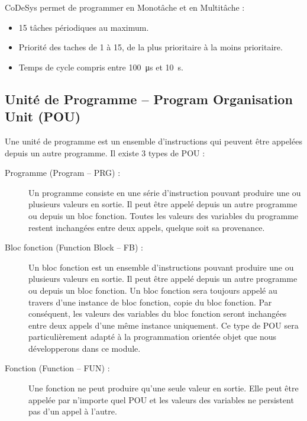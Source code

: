    CoDeSys permet de programmer en Monotâche et en Multitâche :  
    \begin{itemize}
        \item 15 tâches périodiques au maximum.
        \item Priorité des taches de 1 à 15, de la plus prioritaire à la moins prioritaire.
        \item Temps de cycle compris entre \SI{100}{\micro\second} et \SI{10}{\second}.
    \end{itemize}

    \subsection{Unité de Programme -- Program Organisation Unit (POU)}
    Une unité de programme est un ensemble d'instructions qui peuvent être appelées depuis un autre programme. Il existe 3 types de POU :

    \begin{description}
        \item[Programme (Program -- PRG) : ] Un programme consiste en une série d'instruction pouvant produire une ou plusieurs valeurs en sortie. Il peut être appelé depuis un autre programme ou depuis un bloc fonction.
        Toutes les valeurs des variables du programme restent inchangées entre deux appels, quelque soit sa provenance. 
        
        \item[Bloc fonction (Function Block -- FB) : ] Un bloc fonction est un ensemble d'instructions pouvant produire une ou plusieurs valeurs en sortie. Il peut être appelé depuis un autre programme ou depuis un bloc fonction. Un bloc fonction sera toujours appelé au travers d'une instance de bloc fonction, copie du bloc fonction. Par conséquent, les valeurs des variables du bloc fonction seront inchangées entre deux appels d'une même instance uniquement. Ce type de POU sera particulièrement adapté à la programmation orientée objet que nous développerons dans ce module. 
        \item[Fonction (Function -- FUN) : ] Une fonction ne peut produire qu'une seule valeur en sortie. Elle peut être appelée par n'importe quel POU et les valeurs des variables ne persistent pas d'un appel à l'autre. 
    \end{description}



